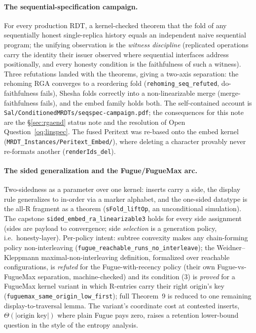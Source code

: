 \documentclass[11pt]{article}
\newcommand{\lean}[1]{\texttt{#1}}
\begin{document}
\paragraph{The sequential-specification campaign.} For every production
RDT, a kernel-checked theorem that the fold of any sequentially honest
single-replica history equals an independent naive sequential program;
the unifying observation is the \emph{witness discipline} (replicated
operations carry the identity their issuer observed where sequential
interfaces address positionally, and every honesty condition is the
faithfulness of such a witness). Three refutations landed with the
theorems, giving a two-axis separation: the rehoming RGA converges to a
reordering fold (\lean{rehoming\_seq\_refuted}, do-faithfulness fails),
Shesha folds correctly into a non-linearizable merge (merge-faithfulness
fails), and the embed family holds both. The self-contained account is
\lean{Sal/ConditionedMRDTs/seqspec-campaign.pdf}; the consequences for
this note are the \S\ref{sec:rgaend} status note and the resolution of
Open Question~\ref{oq:linspec}. The fused Peritext was re-based onto the
embed kernel (\lean{MRDT\_Instances/Peritext\_Embed/}), where deleting a
character provably never re-formats another (\lean{renderIds\_del}).

\paragraph{The sided generalization and the Fugue/FugueMax arc.}
Two-sidedness as a parameter over one kernel: inserts carry a side, the
display rule generalizes to in-order via a marker alphabet, and the
one-sided datatype is the all-R fragment as a theorem
(\lean{sFold\_liftOp}, an unconditional simulation). The capstone
\lean{sided\_embed\_ra\_linearizable3} holds for every side assignment
(sides are payload to convergence; side \emph{selection} is a generation
policy, i.e.\ honesty-layer). Per-policy intent: subtree convexity makes
any chain-forming policy non-interleaving
(\lean{fugue\_reachable\_runs\_no\_interleave}); the Weidner--Kleppmann
maximal-non-interleaving definition, formalized over reachable
configurations, is \emph{refuted} for the Fugue-with-recency policy
(their own Fugue-vs-FugueMax separation, machine-checked) and its
condition (3) is \emph{proved} for a FugueMax kernel variant in which
R-entries carry their right origin's key
(\lean{fuguemax\_same\_origin\_low\_first}); full Theorem~9 is reduced to
one remaining display-to-traversal lemma. The variant's coordinate cost
at contested inserts, $\Theta(|\text{origin key}|)$ where plain Fugue
pays zero, raises a retention lower-bound question in the style of the
entropy analysis.
\end{document}
